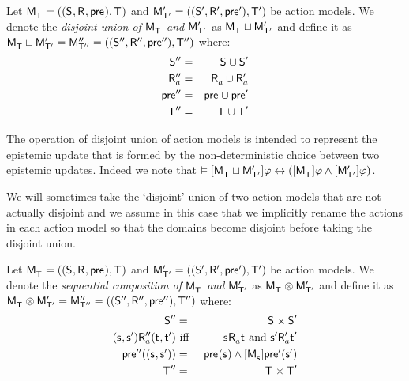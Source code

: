 \begin{definition}\label{aml-choice}
    Let $\aPModelAndTuple{\aStatesT}$ and $\aPModelAndTupleP{\aStatesTP}$ be action models.
    We denote the {\em disjoint union of $\aPModel{\aStatesT}$ and ${\mathsf{M}^{\prime}_{{\mathsf{{T}}^{\prime}}}}$} as $\aPModel{\aStatesT} \choice \aPModelP{\aStatesTP}$ and define it as $\aPModel{\aStatesT} \choice \aPModelP{\aStatesTP} = \aPModelAndTuplePP{\aStatesTPP}$ where:
    \begin{eqnarray*}
        \aStatesPP &=& \aStates \cup \aStatesP\\
        \aAccessibilityPPA &=& \aAccessibilityA \cup \aAccessibilityPA\\
        \aPreconditionPP &=& \aPrecondition \cup \aPreconditionP\\
        \aStatesTPP &=& \aStatesT \cup \aStatesTP
    \end{eqnarray*}
\end{definition}

The operation of disjoint union of action models is intended to represent the epistemic update that is formed by the non-deterministic choice between two epistemic updates.
Indeed we note that $\entails \actionA{\aPModel{\aStatesT} \choice \aPModelP{\aStatesTP}} \phi \iff (\actionA{\aPModel{\aStatesT}} \phi \land \actionA{\aPModelP{\aStatesTP}} \phi)$.

We will sometimes take the `disjoint' union of two action models that are not actually disjoint and we assume in this case that we implicitly rename the actions in each action model so that the domains become disjoint before taking the disjoint union.

\begin{definition}\label{aml-composition}
    Let $\aPModelAndTuple{\aStatesT}$ and $\aPModelAndTupleP{\aStatesTP}$ be action models.
    We denote the {\em sequential composition of $\aPModel{\aStatesT}$ and ${\mathsf{M}^{\prime}_{{\mathsf{{T}}^{\prime}}}}$} as $\aPModel{\aStatesT} \compose \aPModelP{\aStatesTP}$ and define it as $\aPModel{\aStatesT} \compose \aPModelP{\aStatesTP} = \aPModelAndTuplePP{\aStatesTPP}$ where:
    \begin{eqnarray*}
        \aStatesPP &=& \aStates \times \aStatesP\\
        (\aStateS, \aStateSP) \aAccessibilityPPA (\aStateT, \aStateTP) &\text{ iff }& \aStateS \aAccessibilityA \aStateT \text{ and } \aStateSP \aAccessibilityPA \aStateTP\\
        \aPreconditionPP((\aStateS, \aStateSP)) &=& \aPrecondition(\aStateS) \land \actionA{\aPModel{\aStateS}} \aPreconditionP(\aStateSP)\\
        \aStatesTPP &=& \aStatesT \times \aStatesTP
    \end{eqnarray*}
\end{definition}

